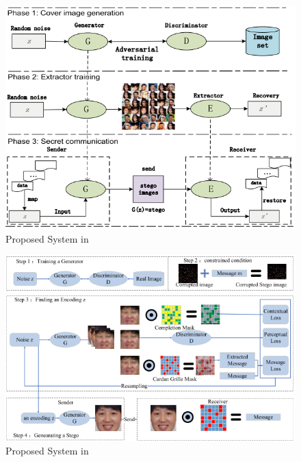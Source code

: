 \documentclass[11pt]{beamer}
\begin{document}
\begin{frame} %
	\begin{figure}
		\includegraphics[scale=0.4]{../images/Hu}
		\caption{Proposed System in \cite{Hu2018}}
	\end{figure}
\end{frame}

\begin{frame} %
	\begin{figure}
		\includegraphics[scale=0.45]{../images/zhang}
		\caption{Proposed System in }
	\end{figure}
\end{frame}
\end{document}
